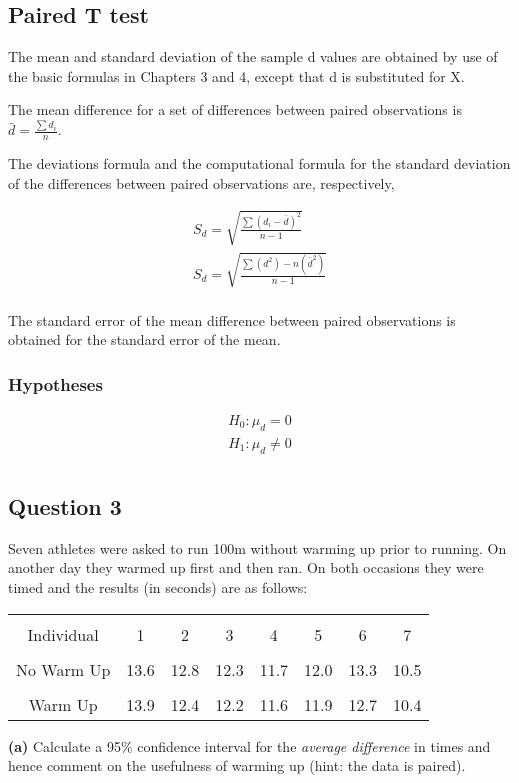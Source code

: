 \documentclass[a4paper,12pt]{article}
\begin{document}
\subsection{Paired T test}
The mean and standard deviation of the sample d values are
obtained by use of the basic formulas in Chapters 3 and 4, except
that d is substituted for X.

The mean difference for a set of differences between paired
observations is $\bar{d} = \frac{\sum d_{i}}{n}$.

The deviations formula and the computational formula for the
standard deviation of the differences between paired observations
are, respectively,

\begin{eqnarray}
S_{d} = \sqrt{\frac{\sum (d_{i}-\bar{d})^2}{n-1}}\\
S_{d} = \sqrt{\frac{ \sum (d^2)- n(\bar{d}^2)}{n-1}}\\
\end{eqnarray}

The standard error of the mean difference between paired
observations is obtained for the standard error of the mean.
\subsubsection{Hypotheses}
\begin{eqnarray*}
H_{0}: \mu_{d} = 0\\
H_{1}: \mu_{d} \neq 0\\
\end{eqnarray*}


\subsection*{Question 3}
	Seven athletes were asked to run 100m without warming up prior to running. On another day they warmed up first and then ran. On both occasions they were timed and the results (in seconds) are as follows:\\[-0.3cm]
	\begin{center}
		\begin{tabular}{|c|ccccccc|}
			\hline
			&&&&&&&\\[-0.3cm]
			Individual & 1 & 2 & 3 & 4 & 5 & 6 & 7 \\[0.1cm]
			\hline
			&&&&&&&\\[-0.3cm]
			No Warm Up    & 13.6 & 12.8 & 12.3 & 11.7 & 12.0 & 13.3 & 10.5 \\[0.1cm]
			\hline
			&&&&&&&\\[-0.3cm]
			Warm Up       & 13.9 & 12.4 & 12.2 & 11.6 & 11.9 & 12.7 & 10.4 \\[0.1cm]
			\hline
		\end{tabular}
	\end{center}
	
	{\bf(a)} Calculate a 95\% confidence interval for the \emph{average difference} in times and hence comment on the usefulness of warming up (hint: the data is paired).
	
	
\end{document}
